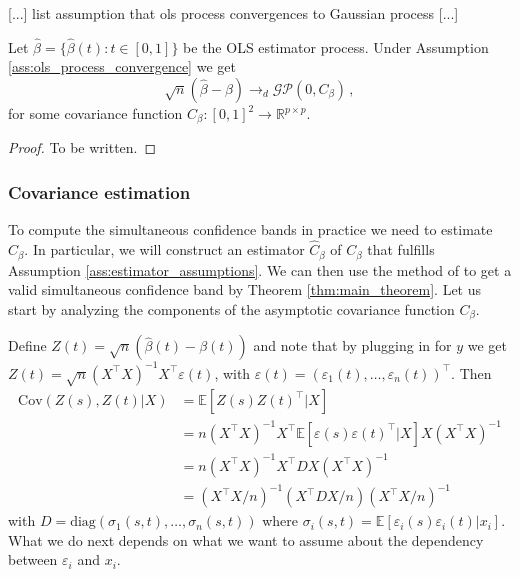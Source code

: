 \begin{assumption}
    \label{ass:ols_process_convergence}
    [...] list assumption that ols process convergences to Gaussian process [...]
\end{assumption}

\begin{theorem}
    Let $\hat{\beta} = \{\hat{\beta}(t) : t \in [0, 1]\}$ be the OLS estimator process.
    Under Assumption \ref{ass:ols_process_convergence} we get
    \[
        \sqrt{n}(\hat{\beta} - \beta) \to_d \mathcal{GP}(0, C_\beta) \,,
    \]
    for some covariance function $C_\beta : [0, 1]^2 \to \mathbb{R}^{p \times p}$.
\end{theorem}
\begin{proof}
    To be written.
\end{proof}

\subsubsection{Covariance estimation}

To compute the simultaneous confidence bands in practice we need to estimate $C_\beta$.
In particular, we will construct an estimator $\hat{C}_\beta$ of $C_\beta$ that fulfills
Assumption \ref{ass:estimator_assumptions}. We can then use the method of
\cite{liebl2021} to get a valid simultaneous confidence band by Theorem
\ref{thm:main_theorem}. Let us start by analyzing the components of the asymptotic
covariance function $C_\beta$.

Define $Z(t) = \sqrt{n}(\hat{\beta}(t) - \beta(t))$ and note that by plugging in for $y$
we get $Z(t) = \sqrt{n}(X^\top X)^{-1}X^\top \varepsilon(t)$, with $\varepsilon(t) =
(\varepsilon_1(t), \dots, \varepsilon_n(t))^\top$. Then
\begin{align*}
    \text{Cov}(Z(s), Z(t) | X)
    &= \mathbb{E}[Z(s) Z(t)^\top | X]\\
    &= n (X^\top X)^{-1} X^\top \mathbb{E}[\varepsilon(s)\varepsilon(t)^\top | X] X
    (X^\top X)^{-1}\\
    &= n (X^\top X)^{-1} X^\top D X (X^\top X)^{-1}\\
    &= (X^\top X / n)^{-1} (X^\top D X / n) (X^\top X / n)^{-1}
\end{align*}
with $D = \text{diag}(\sigma_1(s, t), \dots, \sigma_n(s, t))$ where $\sigma_i(s, t) =
\mathbb{E}[\varepsilon_i(s) \varepsilon_i(t) | x_i]$. What we do next depends on what we
want to assume about the dependency between $\varepsilon_i$ and $x_i$.

